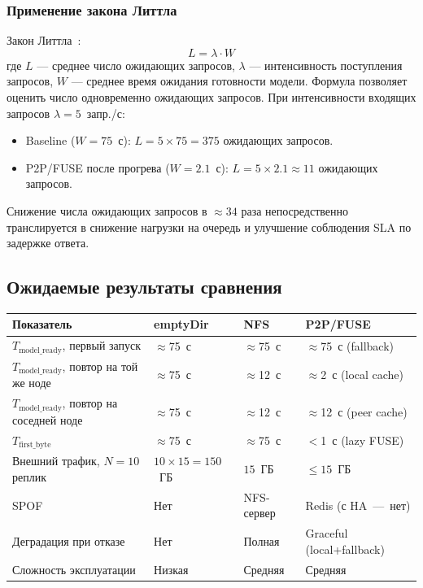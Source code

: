 \subsubsection{Применение закона Литтла}

Закон Литтла~\cite{little1961}:
\begin{equation}
  L = \lambda \cdot W
  \label{eq:little-evaluation}
\end{equation}
где $L$ --- среднее число ожидающих запросов, $\lambda$ --- интенсивность поступления запросов, $W$ --- среднее время ожидания готовности модели.
Формула позволяет оценить число одновременно ожидающих запросов. При интенсивности входящих запросов $\lambda = 5$~запр./с:
\begin{itemize}[leftmargin=*]
  \item Baseline ($W = 75$~с): $L = 5 \times 75 = 375$ ожидающих запросов.
  \item P2P/FUSE после прогрева ($W = 2.1$~с): $L = 5 \times 2.1 \approx 11$ ожидающих запросов.
\end{itemize}

Снижение числа ожидающих запросов в $\approx 34$ раза непосредственно транслируется в снижение нагрузки на очередь и улучшение соблюдения SLA по задержке ответа.

\subsection{Ожидаемые результаты сравнения}

\begin{table}[htbp]
\centering
\begingroup
\setlength{\tabcolsep}{3pt}
\tablebodyfont
\begin{tabularx}{\textwidth}{|>{\raggedright\arraybackslash}p{43mm}|>{\centering\arraybackslash}p{25mm}|>{\centering\arraybackslash}p{25mm}|>{\centering\arraybackslash}X|}
\hline
\textbf{Показатель} & \textbf{emptyDir} & \textbf{NFS} & \textbf{P2P/FUSE} \\ \hline
$T_{\mathrm{model\_ready}}$, первый запуск & $\approx$75~с & $\approx$75~с & $\approx$75~с (fallback) \\ \hline
$T_{\mathrm{model\_ready}}$, повтор на той же ноде & $\approx$75~с & $\approx$12~с & $\approx$2~с (local cache) \\ \hline
$T_{\mathrm{model\_ready}}$, повтор на соседней ноде & $\approx$75~с & $\approx$12~с & $\approx$12~с (peer cache) \\ \hline
$T_{\mathrm{first\_byte}}$ & $\approx$75~с & $\approx$75~с & $<$1~с (lazy FUSE) \\ \hline
Внешний трафик, $N=10$ реплик & $10 \times 15 = 150$~ГБ & $15$~ГБ & $\leq 15$~ГБ \\ \hline
SPOF & Нет & NFS-сервер & Redis (с HA~---~нет) \\ \hline
Деградация при отказе & Нет & Полная & Graceful (local+fallback) \\ \hline
Сложность эксплуатации & Низкая & Средняя & Средняя \\
\hline
\end{tabularx}
\endgroup
\end{table}

